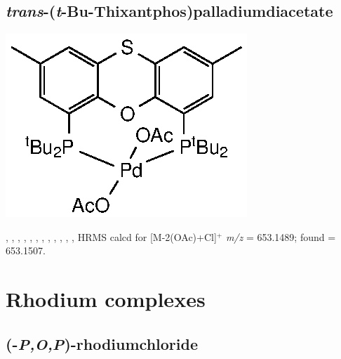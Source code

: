 \subsection*{\emph{trans}-(\emph{t}-Bu-Thixantphos)palladiumdiacetate}

\begin{structure}[h]
\begin{center}
\includegraphics{../Structures/StBuPdOAc2.eps}
\end{center}
\end{structure}

,
,
,
,
,
,
,
,
,
,
,
,
HRMS calcd for  [M-2(OAc)+Cl]$^+$ \emph{m/z} = 653.1489; found = 653.1507.


\section{Rhodium complexes}


\subsection*{(\tBuSixantphosk-\emph{P,O,P})-rhodiumchloride}

